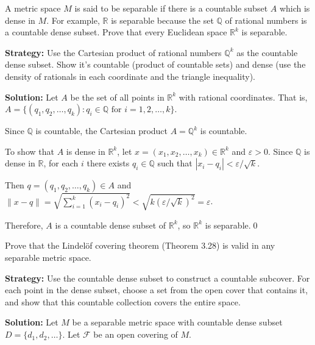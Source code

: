 \begin{problembox}
A metric space \( M \) is said to be separable if there is a countable subset \( A \) which is dense in \( M \). For example, \( \mathbb{R} \) is separable because the set \( \mathbb{Q} \) of rational numbers is a countable dense subset. Prove that every Euclidean space \( \mathbb{R}^k \) is separable.
\end{problembox}

\noindent\textbf{Strategy:} Use the Cartesian product of rational numbers $\mathbb{Q}^k$ as the countable dense subset. Show it's countable (product of countable sets) and dense (use the density of rationals in each coordinate and the triangle inequality).

\bigskip\noindent\textbf{Solution:} Let $A$ be the set of all points in $\mathbb{R}^k$ with rational coordinates. That is, $A = \{(q_1, q_2, \ldots, q_k) : q_i \in \mathbb{Q} \text{ for } i = 1,2,\ldots,k\}$.

Since $\mathbb{Q}$ is countable, the Cartesian product $A = \mathbb{Q}^k$ is countable.

To show that $A$ is dense in $\mathbb{R}^k$, let $x = (x_1, x_2, \ldots, x_k) \in \mathbb{R}^k$ and $\varepsilon > 0$. Since $\mathbb{Q}$ is dense in $\mathbb{R}$, for each $i$ there exists $q_i \in \mathbb{Q}$ such that $|x_i - q_i| < \varepsilon/\sqrt{k}$.

Then $q = (q_1, q_2, \ldots, q_k) \in A$ and $\|x - q\| = \sqrt{\sum_{i=1}^k (x_i - q_i)^2} < \sqrt{k(\varepsilon/\sqrt{k})^2} = \varepsilon$.

Therefore, $A$ is a countable dense subset of $\mathbb{R}^k$, so $\mathbb{R}^k$ is separable.\qed


\begin{problembox}
Prove that the Lindelöf covering theorem (Theorem 3.28) is valid in any separable metric space.
\end{problembox}

\noindent\textbf{Strategy:} Use the countable dense subset to construct a countable subcover. For each point in the dense subset, choose a set from the open cover that contains it, and show that this countable collection covers the entire space.

\bigskip\noindent\textbf{Solution:} Let $M$ be a separable metric space with countable dense subset $D = \{d_1, d_2, \ldots\}$. Let $\mathcal{F}$ be an open covering of $M$.

